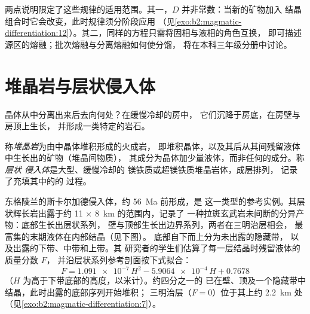 两点说明限定了这些规律的适用范围。其一，$D$ 并非常数：当新的矿物加入
结晶组合时它会改变，此时规律须分阶段应用
（见\cref{exo:b2:magmatic-differentiation:12}）。其二，同样的方程只需将固相与液相的角色互换，
即可描述源区的熔融；批次熔融与分离熔融如何使分馏，
将在本科三年级分册中讨论。

\section{堆晶岩与层状侵入体}\label{sec:b2:magmatic-differentiation:cumulates}

晶体从中分离出来后去向何处？在缓慢冷却的房中，
它们沉降于房底，在房壁与房顶上生长，
并形成一类特定的岩石。

\begin{definition}\label{def:b2:magmatic-differentiation:cumulate}
称\emph{堆晶岩}为由中晶体堆积形成的火成岩，
即堆积晶体，以及其后从其间残留液体中生长出的矿物（堆晶间物质），
其成分为晶体加少量液体，而非任何的成分。称\emph{层状
侵入体}是大型、缓慢冷却的
镁铁质或超镁铁质堆晶岩体，成层排列，
记录了充填其中的的
过程。
\end{definition}

东格陵兰的斯卡尔加德侵入体，约 \qty{56}{Ma} 前形成，是
这一类型的参考实例。其层状辉长岩出露于约 11 × \qty{8}{km} 的范围内，记录了
一种拉斑玄武岩未间断的分异产物：底部生长出层状系列，
壁与顶部生长出边界系列，两者在三明治层相会，
最富集的末期液体在内部结晶（见下图）。
底部自下而上分为未出露的隐藏带，
以及出露的下带、中带和上带。其
研究者的学生们估算了每一层结晶时残留液体的质量分数 $F$，
并沿层状系列参考剖面按下式拟合：
\[
F = \num{1.091e-7}\,H^2 - \num{5.9064e-4}\,H + 0.7678
\]
（$H$ 为高于下带底部的高度，以米计）。约四分之一的
已在壁、顶及一个隐藏带中结晶，此时出露的底部序列开始堆积；
三明治层（$F = 0$）位于其上约 \qty{2.2}{km} 处
（见\cref{exo:b2:magmatic-differentiation:7}）。

